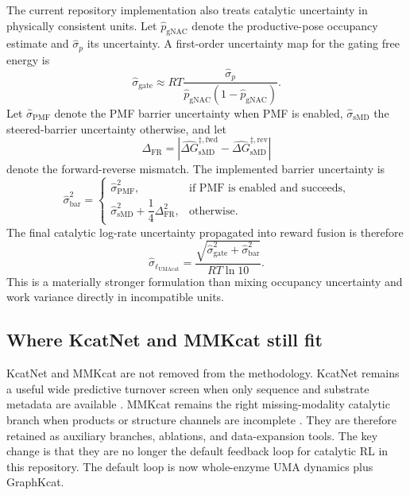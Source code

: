 \documentclass[11pt]{article}
\begin{document}
	The current repository implementation also treats catalytic uncertainty in physically consistent units. Let $\widehat p_{\mathrm{gNAC}}$ denote the productive-pose occupancy estimate and $\widehat \sigma_{p}$ its uncertainty. A first-order uncertainty map for the gating free energy is
	\begin{equation}
		\widehat \sigma_{\mathrm{gate}}
		\approx
		RT\frac{\widehat \sigma_p}{\widehat p_{\mathrm{gNAC}}(1-\widehat p_{\mathrm{gNAC}})}.
	\end{equation}
	Let $\widehat \sigma_{\mathrm{PMF}}$ denote the PMF barrier uncertainty when PMF is enabled, $\widehat \sigma_{\mathrm{sMD}}$ the steered-barrier uncertainty otherwise, and let
	\begin{equation}
		\Delta_{\mathrm{FR}}
		=
		\left|\widehat{\Delta G}_{\mathrm{sMD}}^{\ddagger,\mathrm{fwd}}-\widehat{\Delta G}_{\mathrm{sMD}}^{\ddagger,\mathrm{rev}}\right|
	\end{equation}
	denote the forward-reverse mismatch. The implemented barrier uncertainty is
	\begin{equation}
		\widehat \sigma_{\mathrm{bar}}^2
		=
		\begin{cases}
			\widehat \sigma_{\mathrm{PMF}}^2, & \text{if PMF is enabled and succeeds},\\[4pt]
			\widehat \sigma_{\mathrm{sMD}}^2 + \dfrac{1}{4}\Delta_{\mathrm{FR}}^2, & \text{otherwise.}
		\end{cases}
	\end{equation}
	The final catalytic log-rate uncertainty propagated into reward fusion is therefore
	\begin{equation}
		\widehat \sigma_{\ell_{\mathrm{UMAcat}}}
		=
		\frac{\sqrt{\widehat \sigma_{\mathrm{gate}}^2+\widehat \sigma_{\mathrm{bar}}^2}}{RT\ln 10}.
	\end{equation}
	This is a materially stronger formulation than mixing occupancy uncertainty and work variance directly in incompatible units.
	
	\subsection{Where KcatNet and MMKcat still fit}
	
	KcatNet and MMKcat are not removed from the methodology. KcatNet remains a useful wide predictive turnover screen when only sequence and substrate metadata are available \citep{pan2026kcatnet}. MMKcat remains the right missing-modality catalytic branch when products or structure channels are incomplete \citep{sun2025mmkcat}. They are therefore retained as auxiliary branches, ablations, and data-expansion tools. The key change is that they are no longer the default feedback loop for catalytic RL in this repository. The default loop is now whole-enzyme UMA dynamics plus GraphKcat.
	
\end{document}

